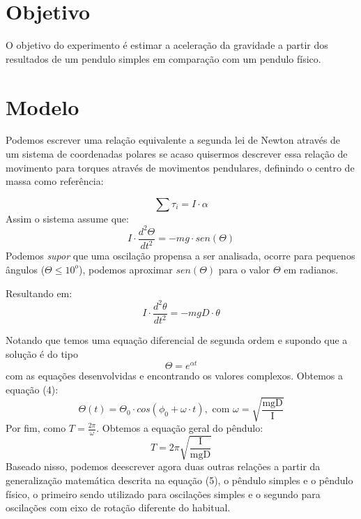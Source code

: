 \documentclass[a4paper]{report}
\begin{document}
\section*{Objetivo}
\qquad O objetivo do experimento é estimar a aceleração da gravidade a partir dos resultados de um pendulo simples em comparação com um pendulo físico. 


\section*{Modelo}
\qquad Podemos escrever uma relação equivalente a segunda lei de Newton através de um sistema de coordenadas polares se acaso quisermos descrever essa relação de movimento para torques através de movimentos pendulares, definindo o centro de massa como referência: 

\begin{equation}
    \sum{\tau_i} =  I\cdot \alpha
\end{equation}
\qquad Assim o sistema assume que:
\begin{equation}
    I \cdot \frac{d^2\Theta}{dt ^2} = - mg\cdot sen(\Theta)
\end{equation}
\qquad Podemos \textit{supor} que uma oscilação propensa a ser analisada, ocorre para pequenos ângulos ($\Theta \leq 10^{o}$), podemos aproximar $sen(\Theta)$ para o valor $\Theta$ em radianos.

Resultando em:
\begin{equation}
    I \cdot \frac{d^2\theta}{dt ^2} = - mgD\cdot \theta
\end{equation}
\begin{center}

\end{center}
\qquad Notando que temos uma equação diferencial de segunda ordem e supondo que a solução é do tipo 
\begin{equation}
\Theta = e^{\alpha t}
\end{equation}
\qquad com as equações desenvolvidas e encontrando os valores complexos. Obtemos a equação (4):
\begin{equation}
    \Theta(t) = \Theta_0 \cdot cos(\phi_0 + \omega \cdot t), \text{ com } \omega = \sqrt{\frac{\text{mgD}}{\text{I}}}
\end{equation}
\qquad Por fim, como $T = \frac{2\pi}{\omega}$. Obtemos a equação geral do pêndulo:
\begin{equation}
    T = 2\pi \sqrt{\frac{\text{I}}{\text{mgD}}}
\end{equation}
\qquad Baseado nisso, podemos deescrever agora duas outras relações a partir da generalização matemática descrita na equação (5), o pêndulo simples e o pêndulo físico, o primeiro sendo utilizado para oscilações simples e o segundo para oscilações com eixo de rotação diferente do habitual.
\end{document}
